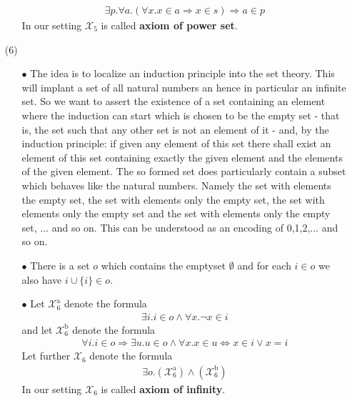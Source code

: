\begin{enumerate}
\begin{enumerate}
\begin{align*}
  \exists
  p
  .
  \forall
  a
  .
  \left(
    \forall
    x
    .
    x
    \in
    a
    \Rightarrow
    x
    \in
    s
  \right)
  \Rightarrow
  a
  \in
  p
\end{align*}
In our setting $\mathcal{X}_{5}$ is called \textbf{axiom of power set}.
\end{enumerate}
\item[(6)]
\begin{enumerate}
\item[$\bullet$]
The idea is to {\glqq}localize{\grqq} an induction principle into the set theory. This will implant a set of all natural numbers an hence in particular an infinite set. So we want to assert the existence of a set containing an element where the induction can start which is chosen to be the empty set - that is, the set such that any other set is not an element of it - and, by the induction principle: if given any element of this set there shall exist an element of this set containing exactly the given element and the elements of the given element. The so formed set does particularly contain a subset which behaves like the natural numbers. Namely the set with elements the empty set, the set with elements only the empty set, the set with elements only the empty set and the set with elements only the empty set, ... and so on. This can be understood as an encoding of 0,1,2,... and so on.
\item[$\bullet$]
There is a set $o$ which contains the emptyset $\emptyset$ and for each $i \in o$ we also have $i \cup \lbrace i \rbrace \in o$.
\item[$\bullet$]
Let $\mathcal{X}_{6}^{\textrm{a}}$ denote the formula
\begin{align*}
  \exists
  i
  .
  i
  \in
  o
  \land
  \forall
  x
  .
  \neg
  x
  \in
  i
\end{align*}
and let $\mathcal{X}_{6}^{\textrm{b}}$ denote the formula
\begin{align*}
  \forall
  i
  .
  i
  \in
  o
  \Rightarrow
  \exists
  u
  .
  u
  \in
  o
  \land
  \forall
  x
  .
  x
  \in
  u
  \Leftrightarrow
  x
  \in
  i
  \lor
  x
  =
  i
\end{align*}
Let further $\mathcal{X}_{6}$ denote the formula
\begin{align*}
  \exists
  o
  .
  (\mathcal{X}_{6}^{\textrm{a}})
  \land
  (\mathcal{X}_{6}^{\textrm{b}})
\end{align*}
In our setting $\mathcal{X}_{6}$ is called \textbf{axiom of infinity}.

\end{enumerate}
\end{enumerate}
